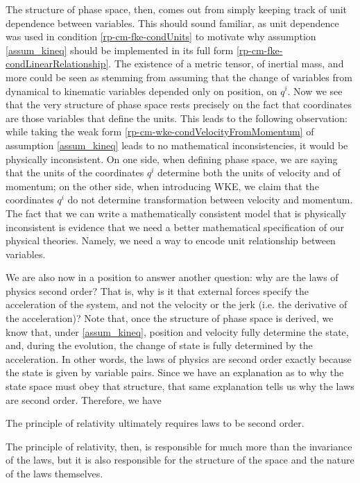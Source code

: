 The structure of phase space, then, comes out from simply keeping track of unit dependence between variables. This should sound familiar, as unit dependence was used in condition \ref{rp-cm-fke-condUnits} to motivate why assumption \ref{assum_kineq} should be implemented in its full form \ref{rp-cm-fke-condLinearRelationship}. The existence of a metric tensor, of inertial mass, and more could be seen as stemming from assuming that the change of variables from dynamical to kinematic variables depended only on position, on $q^i$. Now we see that the very structure of phase space rests precisely on the fact that coordinates are those variables that define the units. This leads to the following observation: while taking the weak form \ref{rp-cm-wke-condVelocityFromMomentum} of assumption \ref{assum_kineq} leads to no mathematical inconsistencies, it would be physically inconsistent. On one side, when defining phase space, we are saying that the units of the coordinates $q^i$ determine both the units of velocity and of momentum; on the other side, when introducing WKE, we claim that  the coordinates $q^i$ do not determine transformation between velocity and momentum. The fact that we can write a mathematically consistent model that is physically inconsistent is evidence that we need a better mathematical specification of our physical theories. Namely, we need a way to encode unit relationship between variables.

We are also now in a position to answer another question: why are the laws of physics second order? That is, why is it that external forces specify the acceleration of the system, and not the velocity or the jerk (i.e. the derivative of the acceleration)? Note that, once the structure of phase space is derived, we know that, under \ref{assum_kineq}, position and velocity fully determine the state, and, during the evolution, the change of state is fully determined by the acceleration. In other words, the laws of physics are second order exactly because the state is given by variable pairs. Since we have an explanation as to why the state space must obey that structure, that same explanation tells us why the laws are second order. Therefore, we have
\begin{insight}
	The principle of relativity ultimately requires laws to be second order.
\end{insight}
The principle of relativity, then, is responsible for much more than the invariance of the laws, but it is also responsible for the structure of the space and the nature of the laws themselves.


